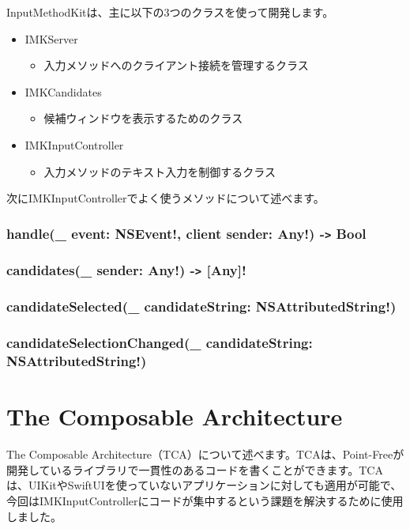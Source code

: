\documentclass[uplatex,a4j,12pt,twocolumn]{jsarticle}
\begin{document}
InputMethodKitは、主に以下の3つのクラスを使って開発します。
\begin{itemize}
    \item IMKServer
    \begin{itemize}
        \item 入力メソッドへのクライアント接続を管理するクラス\cite{bib:imkserver}
    \end{itemize}
    \item IMKCandidates
    \begin{itemize}
        \item 候補ウィンドウを表示するためのクラス\cite{bib:imk_candidates}
    \end{itemize}
    \item IMKInputController
    \begin{itemize}
        \item 入力メソッドのテキスト入力を制御するクラス\cite{bib:imk_input_controller}
    \end{itemize}
\end{itemize}

次にIMKInputControllerでよく使うメソッドについて述べます。
\subsubsection{handle(\_ event: NSEvent!, client sender: Any!) -\texttt{>} Bool}


\subsubsection{candidates(\_ sender: Any!) -\texttt{>} [Any]!}

\subsubsection{candidateSelected(\_ candidateString: NSAttributedString!)}

\subsubsection{candidateSelectionChanged(\_ candidateString: NSAttributedString!)}



\section{The Composable Architecture}\label{sec:the_composable_architecture}
The Composable Architecture（TCA）について述べます。TCAは、Point-Freeが開発しているライブラリで一貫性のあるコードを書くことができます。TCAは、UIKitやSwiftUIを使っていないアプリケーションに対しても適用が可能で、今回はIMKInputControllerにコードが集中するという課題を解決するために使用しました。
\end{document}
